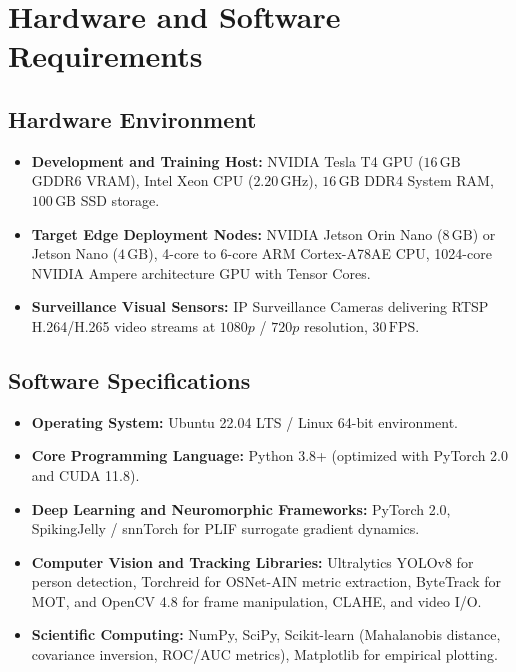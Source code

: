 \documentclass[12pt,a4paper]{report}
\begin{document}
\section{Hardware and Software Requirements}

\subsection{Hardware Environment}
\begin{itemize}
    \item \textbf{Development and Training Host:} NVIDIA Tesla T4 GPU ($16\,\text{GB}$ GDDR6 VRAM), Intel Xeon CPU ($2.20\,\text{GHz}$), $16\,\text{GB}$ DDR4 System RAM, $100\,\text{GB}$ SSD storage.
    \item \textbf{Target Edge Deployment Nodes:} NVIDIA Jetson Orin Nano ($8\,\text{GB}$) or Jetson Nano ($4\,\text{GB}$), 4-core to 6-core ARM Cortex-A78AE CPU, 1024-core NVIDIA Ampere architecture GPU with Tensor Cores.
    \item \textbf{Surveillance Visual Sensors:} IP Surveillance Cameras delivering RTSP H.264/H.265 video streams at $1080p$ / $720p$ resolution, $30\,\text{FPS}$.
\end{itemize}

\subsection{Software Specifications}
\begin{itemize}
    \item \textbf{Operating System:} Ubuntu 22.04 LTS / Linux 64-bit environment.
    \item \textbf{Core Programming Language:} Python 3.8+ (optimized with PyTorch 2.0 and CUDA 11.8).
    \item \textbf{Deep Learning and Neuromorphic Frameworks:} PyTorch 2.0, SpikingJelly / snnTorch for PLIF surrogate gradient dynamics.
    \item \textbf{Computer Vision and Tracking Libraries:} Ultralytics YOLOv8 for person detection, Torchreid for OSNet-AIN metric extraction, ByteTrack for MOT, and OpenCV 4.8 for frame manipulation, CLAHE, and video I/O.
    \item \textbf{Scientific Computing:} NumPy, SciPy, Scikit-learn (Mahalanobis distance, covariance inversion, ROC/AUC metrics), Matplotlib for empirical plotting.
\end{itemize}


\end{document}

